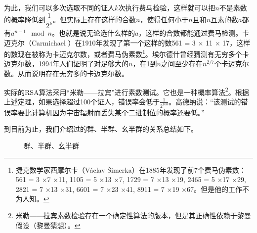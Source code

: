 \documentclass{article}
\begin{document}
为此，我们可以多次选取不同的证人$k$次执行费马检验，这样就可以把$n$不是素数的概率降低到$\dfrac{1}{2^k}$。但实际上存在这样的合数$n$，使得任何小于$n$且和$n$互素的数$a$都有$a^{n-1} \mod n$。也就是说无论选什么样的$a$，这样的合数都能通过费马检测。卡迈克尔（Carmichael ）在1910年发现了第一个这样的数561 = 3 $\times$ 11 $\times$ 17，这样的数现在被称为卡迈克尔数，或者费马伪素数\footnote{捷克数学家西摩尔卡（Václav Šimerka）在1885年发现了前7个费马伪素数：561 = 3 $\times$7 $\times$11, 1105 = 5 $\times$13 $\times$7, 1729 = 7 $\times$13 $\times$19, 2465 = 5 $\times$17 $\times$29, 2821 = 7 $\times$13 $\times$31, 6601 = 7 $\times$23 $\times$41, 8911 = 7 $\times$19 $\times$67。但是他的工作不为人知。}。埃尔德什曾经猜测有无穷多个卡迈克尔数，1994年人们证明了对足够大的$n$，在1到$n$之间至少存在$n^{2/7}$个卡迈克尔数。从而说明存在无穷多的卡迈克尔数\cite{Wiki-Carmichael-number}。

实际的RSA算法采用“米勒——拉宾”进行素数测试。它也是一种概率算法\footnote{米勒——拉宾素数检验存在一个确定性算法的版本，但是其正确性依赖于黎曼假设（黎曼猜想）\cite{Wiki-Miller-Rabin}。}。根据上述定理，如果选择超过100个证人，错误率会低于$\frac{1}{2^{100}}$。高德纳说：“该测试的错误率要比计算机因为宇宙辐射而丢失某个二进制位的概率还要低。”

\vspace{5mm}

到目前为止，我们介绍过的群、半群、幺半群的关系总结如下。

\begin{figure}[htbp]
\centering
{}
\caption{群、半群、幺半群}
\label{fig:groups}
\end{figure}
\end{document}
